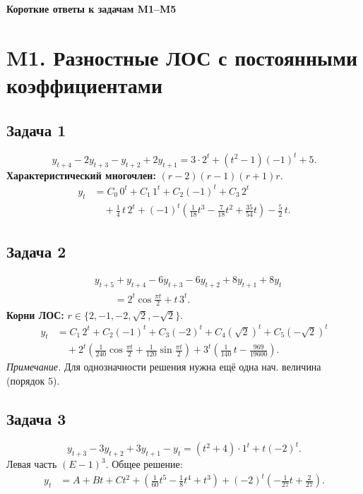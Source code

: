 \documentclass[12pt]{article}
\begin{document}
\begin{center}
\Large\textbf{Короткие ответы к задачам M1--M5}
\end{center}

\section*{M1. Разностные ЛОС с постоянными коэффициентами}

\subsection*{Задача 1}
\[
y_{t+4}-2y_{t+3}-y_{t+2}+2y_{t+1}=3\cdot 2^{t}+(t^2-1)(-1)^t+5.
\]
\textbf{Характеристический многочлен: } $(r-2)(r-1)(r+1)r$.
\[
\begin{aligned}
y_t&=C_0\,0^t+C_1\,1^t+C_2(-1)^t+C_3\,2^t\\
&\quad+\tfrac14\,t\,2^t
+(-1)^t\!\left(\tfrac1{18}t^3-\tfrac7{18}t^2+\tfrac{35}{54}t\right)
-\tfrac52\,t.
\end{aligned}
\]

\subsection*{Задача 2}
\[
\begin{aligned}
&y_{t+5}+y_{t+4}-6y_{t+3}-6y_{t+2}+8y_{t+1}+8y_t\\
&\qquad=2^{t}\cos\frac{\pi t}{2}+t\,3^{t}.
\end{aligned}
\]
\textbf{Корни ЛОС: } $r\in\{2,-1,-2,\sqrt2,-\sqrt2\}$.
\[
\begin{aligned}
y_t&=C_1\,2^t+C_2(-1)^t+C_3(-2)^t+C_4(\sqrt2)^t+C_5(-\sqrt2)^t\\
&\quad+2^t\!\left(\tfrac1{240}\cos\frac{\pi t}{2}+\tfrac1{120}\sin\frac{\pi t}{2}\right)
+3^t\!\left(\tfrac1{140}\,t-\tfrac{969}{19600}\right).
\end{aligned}
\]
\textit{Примечание.} Для однозначности решения нужна ещё одна нач. величина (порядок $5$).

\subsection*{Задача 3}
\[
y_{t+3}-3y_{t+2}+3y_{t+1}-y_t=(t^2+4)\cdot1^t+t(-2)^t.
\]
Левая часть $(E-1)^3$. Общее решение:
\[
\begin{aligned}
y_t&=A+Bt+Ct^2
+\left(\tfrac1{60}t^5-\tfrac18 t^4+t^3\right)
+(-2)^t\!\left(-\tfrac1{27}t+\tfrac{2}{27}\right).
\end{aligned}
\]
\end{document}
